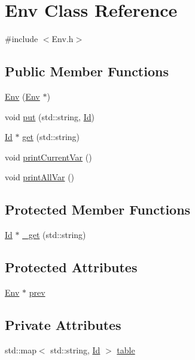 \hypertarget{class_env}{}\section{Env Class Reference}
\label{class_env}


{\ttfamily \#include $<$Env.\+h$>$}

\subsection*{Public Member Functions}
\begin{DoxyCompactItemize}
\item 
\hyperlink{class_env_ab9d20c5b47453e30038f156cc5e25c0f}{Env} (\hyperlink{class_env}{Env} $\ast$)
\item 
void \hyperlink{class_env_a4648c2b83fea7e757ccb4ab519ffc9a0}{put} (std\+::string, \hyperlink{class_id}{Id})
\item 
\hyperlink{class_id}{Id} $\ast$ \hyperlink{class_env_a59bbdcdb7af396f6fb6cbff2f828e62b}{get} (std\+::string)
\item 
void \hyperlink{class_env_a398c166330482abb7e38c546bc3974cf}{print\+Current\+Var} ()
\item 
void \hyperlink{class_env_a8ba6704ef2039c2329569efc99f1e087}{print\+All\+Var} ()
\end{DoxyCompactItemize}
\subsection*{Protected Member Functions}
\begin{DoxyCompactItemize}
\item 
\hyperlink{class_id}{Id} $\ast$ \hyperlink{class_env_aca71253ff9d30153d0834a47cd35a351}{\+\_\+get} (std\+::string)
\end{DoxyCompactItemize}
\subsection*{Protected Attributes}
\begin{DoxyCompactItemize}
\item 
\hyperlink{class_env}{Env} $\ast$ \hyperlink{class_env_a79a41e9166e949e4c1320ffe3750cb29}{prev}
\end{DoxyCompactItemize}
\subsection*{Private Attributes}
\begin{DoxyCompactItemize}
\item 
std\+::map$<$ std\+::string, \hyperlink{class_id}{Id} $>$ \hyperlink{class_env_ab93397b135a614cb1c7e6057a00a8d85}{table}
\end{DoxyCompactItemize}


